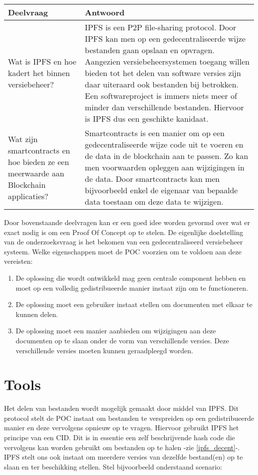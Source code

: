\begin{table}[h!]
\begin{tabularx}{\linewidth}{ |X|X| }
\hline
Deelvraag & Antwoord \\ \hline
Wat is IPFS en hoe kadert het binnen versiebeheer? & IPFS is een P2P file-sharing protocol. Door IPFS kan men op een gedecentraliseerde wijze bestanden gaan opslaan en opvragen. Aangezien versiebeheersystemen toegang willen bieden tot het delen van software versies zijn daar uiteraard ook bestanden bij betrokken. Een softwareproject is immers niets meer of minder dan verschillende bestanden. Hiervoor is IPFS dus een geschikte kanidaat.\\ \hline
Wat zijn smartcontracts en hoe bieden ze een meerwaarde aan Blockchain applicaties? & Smartcontracts is een manier om op een gedecentraliseerde wijze code uit te voeren en de data in de blockchain aan te passen. Zo kan men voorwaarden opleggen aan wijzigingen in de data. Door smartcontracts kan men bijvoorbeeld enkel de eigenaar van bepaalde data toestaan om deze data te wijzigen.\\ \hline
\end{tabularx}
\end{table} 
\newpage

Door bovenstaande deelvragen kan er een goed idee worden gevormd over wat er exact nodig is om een Proof Of Concept op te stelen. De eigenlijke doelstelling van de onderzoeksvraag is het bekomen van een gedecentraliseerd versiebeheer systeem. Welke eigenschappen moet de POC voorzien om te voldoen aan deze vereisten:

\begin{enumerate}
	\item De oplossing die wordt ontwikkeld mag geen centrale component hebben en moet op een volledig gedistribueerde manier instaat zijn om te functioneren.
	\item De oplossing moet een gebruiker instaat stellen om documenten met elkaar te kunnen delen.
	\item De oplossing moet een manier aanbieden om wijzigingen aan deze documenten op te slaan onder de vorm van verschillende versies. Deze verschillende versies moeten kunnen geraadpleegd worden.
\end{enumerate}

\section{Tools}
Het delen van bestanden wordt mogelijk gemaakt door middel van IPFS. Dit protocol stelt de POC instaat om bestanden te verspreiden op een gedistribueerde manier en deze vervolgens opnieuw op te vragen. Hiervoor gebruikt IPFS het principe van een CID. Dit is in essentie een zelf beschrijvende hash code die vervolgens kan worden gebruikt om bestanden op te halen -zie \ref{ipfs_decent}-. IPFS stelt ons ook instaat om meerdere versies van dezelfde bestand(en) op te slaan en ter beschikking stellen. Stel bijvoorbeeld onderstaand scenario:\\

